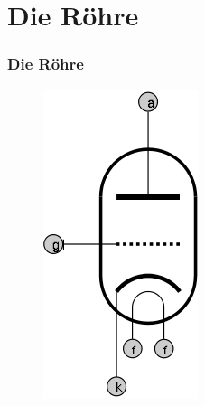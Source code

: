 \section*{Die Röhre}
\begin{frame}
\frametitle{Die Röhre}
\begin{minipage}{0.3\textwidth}
	 \begin{figure}
      \includegraphics[width=\textwidth,height=.5\textheight,keepaspectratio]{e13/ERohre.png}

\end{figure}
\end{minipage}
\end{frame}
